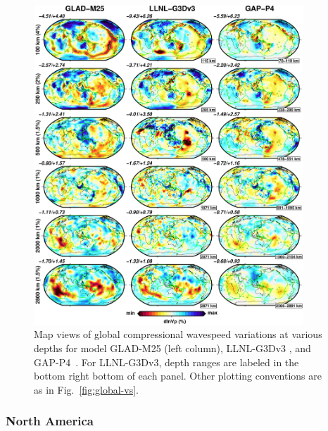 \documentclass[extra,mreferee]{gji}
\begin{document}
\begin{figure}
\includegraphics[width=0.9\textwidth]{figures/depth_slice/globe_vp_LLNL-GAP.pdf}
  \caption{\small{Map views of global compressional wavespeed variations at various depths for model
  GLAD-M25 (left column), LLNL-G3Dv3 \citep[middle column;][]{simmons2012llnl}, and
  GAP-P4~\citep[right column;][]{fukao2013subducted}.
  For LLNL-G3Dv3, depth ranges are labeled in the bottom right
  bottom of each panel. Other plotting conventions are as in Fig.~\ref{fig:global-vs}.}}
\label{fig:global-vp}
\centering
\end{figure}

\subsubsection{North America}
\end{document}
